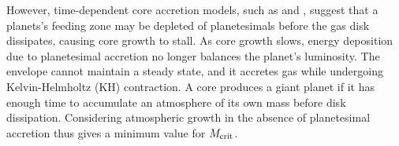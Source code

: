 \documentclass[apj]{emulateapj}
\begin{document}

However, time-dependent core accretion models, such as \citet{pollack96} and \citet{ikoma00}, suggest that a planets's feeding zone may be depleted of planetesimals before the gas disk dissipates, causing core growth to stall. As core growth slows, energy deposition due to planetesimal accretion no longer balances the planet's luminosity. The envelope cannot maintain a steady state, and it accretes gas while  undergoing Kelvin-Helmholtz (KH) contraction. A core  produces a giant planet if it has enough time to accumulate an atmosphere of its own mass before disk dissipation. Considering atmospheric growth in the absence of planetesimal accretion thus gives a minimum value for $M_{\rm crit}$. %


 


\end{document}
